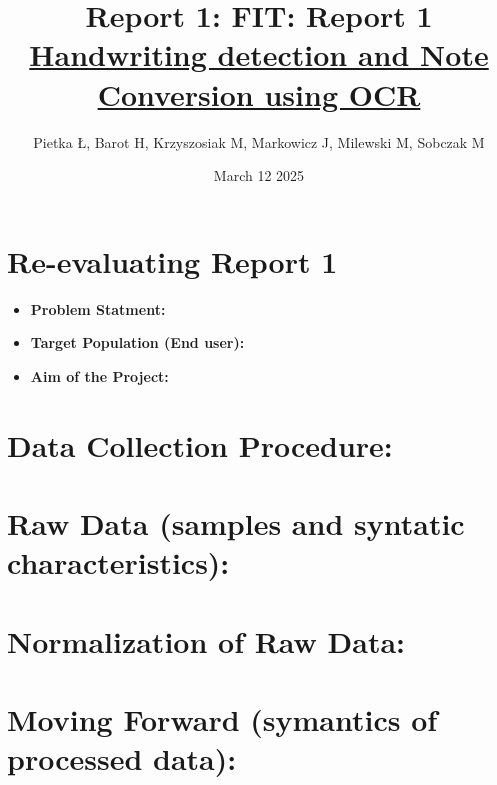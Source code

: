 \documentclass[twoside,a4paper]{article}
\title{Report 1: }
\title{\textbf{FIT: Report 1} \\[1ex] \Large \underline{Handwriting detection and Note Conversion using OCR}
}
\author{Pietka Ł, Barot H, Krzyszosiak M, Markowicz J, Milewski M, Sobczak M}
\date{March 12 2025}
\begin{document}
\maketitle
\tableofcontents
\newpage
\section{Re-evaluating Report 1}
\begin{itemize}
    \item \textbf{Problem Statment: }
    \item \textbf{Target Population (End user): }
    \item \textbf{Aim of the Project: }
\end{itemize}
\section{Data Collection Procedure: }
\section{Raw Data (samples and syntatic characteristics): }
\section{Normalization of Raw Data: }
\section{Moving Forward (symantics of processed data): }
\printbibliography
\end{document}

